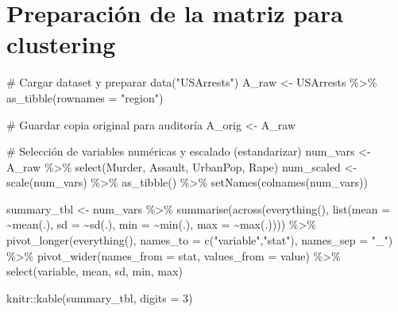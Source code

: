 \documentclass[
  spanish,
  11pt,
  a4paper,
  DIV=11,
  numbers=noendperiod]{scrartcl}
\newenvironment{Shaded}{\begin{snugshade}}{\end{snugshade}}
\newcommand{\AttributeTok}[1]{\textcolor[rgb]{0.40,0.45,0.13}{#1}}
\newcommand{\CommentTok}[1]{\textcolor[rgb]{0.37,0.37,0.37}{#1}}
\newcommand{\DecValTok}[1]{\textcolor[rgb]{0.68,0.00,0.00}{#1}}
\newcommand{\FunctionTok}[1]{\textcolor[rgb]{0.28,0.35,0.67}{#1}}
\newcommand{\NormalTok}[1]{\textcolor[rgb]{0.00,0.23,0.31}{#1}}
\newcommand{\OtherTok}[1]{\textcolor[rgb]{0.00,0.23,0.31}{#1}}
\newcommand{\SpecialCharTok}[1]{\textcolor[rgb]{0.37,0.37,0.37}{#1}}
\newcommand{\StringTok}[1]{\textcolor[rgb]{0.13,0.47,0.30}{#1}}
\begin{document}
\section{Preparación de la matriz para
clustering}\label{preparaciuxf3n-de-la-matriz-para-clustering}

\begin{Shaded}
\begin{Highlighting}[numbers=left,,]
\CommentTok{\# Cargar dataset y preparar}
\FunctionTok{data}\NormalTok{(}\StringTok{"USArrests"}\NormalTok{)}
\NormalTok{A\_raw }\OtherTok{\textless{}{-}}\NormalTok{ USArrests }\SpecialCharTok{\%\textgreater{}\%} \FunctionTok{as\_tibble}\NormalTok{(}\AttributeTok{rownames =} \StringTok{"region"}\NormalTok{)}

\CommentTok{\# Guardar copia original para auditoría}
\NormalTok{A\_orig }\OtherTok{\textless{}{-}}\NormalTok{ A\_raw}

\CommentTok{\# Selección de variables numéricas y escalado (estandarizar)}
\NormalTok{num\_vars }\OtherTok{\textless{}{-}}\NormalTok{ A\_raw }\SpecialCharTok{\%\textgreater{}\%} \FunctionTok{select}\NormalTok{(Murder, Assault, UrbanPop, Rape)}
\NormalTok{num\_scaled }\OtherTok{\textless{}{-}} \FunctionTok{scale}\NormalTok{(num\_vars) }\SpecialCharTok{\%\textgreater{}\%} \FunctionTok{as\_tibble}\NormalTok{() }\SpecialCharTok{\%\textgreater{}\%} \FunctionTok{setNames}\NormalTok{(}\FunctionTok{colnames}\NormalTok{(num\_vars))}

\NormalTok{summary\_tbl }\OtherTok{\textless{}{-}}\NormalTok{ num\_vars }\SpecialCharTok{\%\textgreater{}\%}
\FunctionTok{summarise}\NormalTok{(}\FunctionTok{across}\NormalTok{(}\FunctionTok{everything}\NormalTok{(), }\FunctionTok{list}\NormalTok{(}\AttributeTok{mean =} \SpecialCharTok{\textasciitilde{}}\FunctionTok{mean}\NormalTok{(.), }\AttributeTok{sd =} \SpecialCharTok{\textasciitilde{}}\FunctionTok{sd}\NormalTok{(.),}
\AttributeTok{min =} \SpecialCharTok{\textasciitilde{}}\FunctionTok{min}\NormalTok{(.), }\AttributeTok{max =} \SpecialCharTok{\textasciitilde{}}\FunctionTok{max}\NormalTok{(.)))) }\SpecialCharTok{\%\textgreater{}\%}
\FunctionTok{pivot\_longer}\NormalTok{(}\FunctionTok{everything}\NormalTok{(), }\AttributeTok{names\_to =} \FunctionTok{c}\NormalTok{(}\StringTok{"variable"}\NormalTok{,}\StringTok{"stat"}\NormalTok{), }\AttributeTok{names\_sep =} \StringTok{"\_"}\NormalTok{) }\SpecialCharTok{\%\textgreater{}\%}
\FunctionTok{pivot\_wider}\NormalTok{(}\AttributeTok{names\_from =}\NormalTok{ stat, }\AttributeTok{values\_from =}\NormalTok{ value) }\SpecialCharTok{\%\textgreater{}\%}
\FunctionTok{select}\NormalTok{(variable, mean, sd, min, max)}

\NormalTok{knitr}\SpecialCharTok{::}\FunctionTok{kable}\NormalTok{(summary\_tbl, }\AttributeTok{digits =} \DecValTok{3}\NormalTok{)}
\end{Highlighting}
\end{Shaded}
\end{document}
